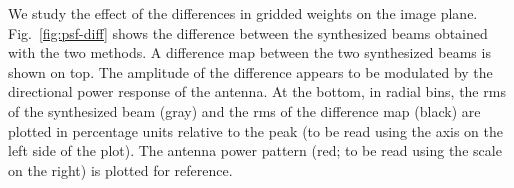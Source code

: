 \documentclass[a4paper,fleqn,usenatbib]{../mnras}
\begin{document}

We study the effect of the differences in gridded weights on the image plane. 
Fig.~\ref{fig:psf-diff} shows the difference between the synthesized beams 
obtained with the two methods. A difference map between the two synthesized 
beams is shown on top. The amplitude of the difference appears to be 
modulated by the directional power response of the antenna. At the bottom, 
in radial bins, the rms of the synthesized beam (gray) and the rms of the 
difference map (black) are plotted in percentage units relative to the peak 
(to be read using the axis on the left side of the plot). The antenna power 
pattern (red; to be read using the scale on the right) is plotted for reference. 
\end{document}
